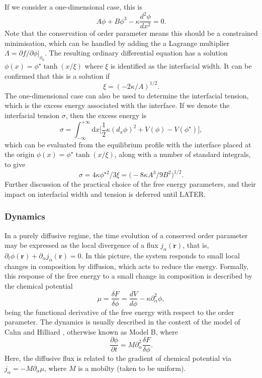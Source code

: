 If we consider a one-dimensional case, this is
\begin{equation}
A\phi + B\phi^3 - \kappa \frac{d^2 \phi}{dx^2} = 0.
\end{equation}
Note that the conservation of order parameter means this should be a
constrained minimisation, which can be handled by adding the
a Lagrange multiplier $\Lambda = \partial f / \partial \phi |_{\phi_0}$.
The resulting ordinary differential equation has a solution
$\phi(x) = \phi^\star \tanh(x/\xi)$ where $\xi$ is identified
as the interfacial width. It can be confirmed that this is a solution
if
\begin{equation}
\xi = (-2\kappa / A)^{1/2}.
\end{equation}
The one-dimensional case can also be used to determine the interfacial
tension, which is the excess energy associated with the interface.
If we denote the interfacial tension $\sigma$, then the excess
energy is
\begin{equation}
\sigma = \int_{-\infty}^{+\infty} \mathrm{d} x
\Big[
{\textstyle \frac{1}{2}} \kappa (d_x \phi)^2 + V(\phi) - V(\phi^\star)
\Big],
\end{equation}
which can be evaluated from the equilibrium profile with the interface
placed at the origin $\phi(x) = \phi^\star\tanh(x/\xi)$, along with a number
of standard integrals, to give
\begin{equation}
\sigma =  4\kappa\phi^{\star 2}/3\xi
 = \big(-8\kappa A^3/9B^2\big)^{1/2}.
\end{equation}
Further discussion of the practical choice of the free energy parameters,
and their
impact on interfacial width and tension is deferred until LATER.

\subsubsection{Dynamics}

In a purely diffusive regime, the time evolution of a conserved
order parameter may be expressed as the local divergence of a flux
$j_\alpha(\mathbf{r})$, that is,
$\partial_t \phi(\mathbf{r}) + \partial_\alpha j_\alpha(\mathbf{r}) = 0$.
In this picture, the system responds to small local changes in composition
by diffusion, which acts to reduce the energy. Formally, this
response of the free energy to a small change in composition is described
by the chemical potential
\begin{equation}
\mu = \frac{\delta F}{\delta \phi} = \frac{dV}{d\phi} - \kappa \partial_\alpha^2 \phi,
\end{equation}
being the functional derivative of the free energy with respect to the
order parameter. The dynamics is usually described in the context of the
model of Cahn and Hilliard \cite{cahn-hilliard-1958}, otherwise known as
Model B, where
\begin{equation}
\frac{\partial \phi}{\partial t} =
M\partial_\alpha^2 \frac{\delta F}{\delta \phi}.
\label{eq-cahn-hilliard}
\end{equation}
Here, the diffusive flux is related to the gradient of chemical potential
via $j_\alpha = -M \partial_\alpha \mu$, where $M$ is a mobilty
(taken to be uniform). 

